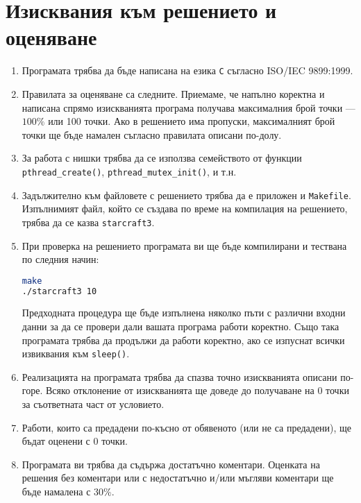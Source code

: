 \documentclass[a4paper,10pt]{article}
\begin{document}
	\section{Изисквания към решението и оценяване}
	
		\begin{enumerate}
			\item Програмата трябва да бъде написана на езика \verb|C| съгласно ISO/IEC 9899:1999.

			\item Правилата за оценяване са следните. Приемаме, че напълно коректна и написана спрямо изискванията програма 
			получава максималния брой точки — $100\%$ или 100 точки. Ако в решението има пропуски, максималният брой точки ще 
			бъде намален съгласно правилата описани по-долу.

			\item За работа с нишки трябва да се използва семейството от функции \verb|pthread_create()|, \verb|pthread_mutex_init()|, и т.н. \item Задължително към файловете с решението трябва да е приложен и
			\verb|Makefile|. Изпълнимият файл, който се създава по време на компилация на решението, трябва да се казва
			\verb|starcraft3|.

			\item При проверка на решението програмата ви ще бъде компилирани и тествана по следния начин:
				\begin{lstlisting}[language=bash]
make
./starcraft3 10
				\end{lstlisting}
				
				Предходната процедура ще бъде изпълнена няколко пъти с различни входни данни за да се провери дали вашата програма работи коректно. Също така програмата трябва да продължи да работи коректно, ако се изпуснат всички извиквания към \verb|sleep()|.

			\item Реализацията на програмата трябва да спазва точно изискванията описани по-горе. Всяко отклонение от 
			изискванията ще доведе до получаване на 0 точки за съответната част от условието.
			
			\item Работи, които са предадени по-късно от обявеното (или не са предадени), ще бъдат оценени с 0 точки.
			
			\item Програмата ви трябва да съдържа достатъчно коментари. Оценката на решения без коментари или с недостатъчно 
			и/или мъгляви коментари ще бъде намалена с $30\%$.
			

\end{enumerate}
\end{document}
